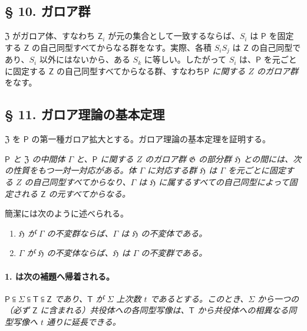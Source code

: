 \subsection*{§ 10. ガロア群}\label{die-galoissche-gruppe}

$\mathfrak Z$ がガロア体、すなわち $\mathsf{Z}_i$ が元の集合として一致するならば、$S_i$ は $\mathsf P$ を固定する $\mathsf{Z}$ の自己同型すべてからなる群をなす。実際、各積 $S_iS_j$ は $\mathsf{Z}$ の自己同型であり、$S_i$ 以外にはないから、ある $S_k$ に等しい。したがって $S_i$ は、$\mathsf P$ を元ごとに固定する $\mathsf{Z}$ の自己同型すべてからなる群、すなわち\emph{$\mathsf P$ に関する $Z$ のガロア群}をなす。

\subsection*{§ 11. ガロア理論の基本定理}\label{der-hauptsatz-der-galoisschen-theorie}

$\mathfrak Z$ を $\mathsf P$ の第一種ガロア拡大とする。ガロア理論の基本定理を証明する。

\emph{$\mathsf P$ と $\mathfrak Z$ の中間体 $\Gamma$ と、$\mathsf P$ に関する $Z$ のガロア群 $\mathfrak G$ の部分群 $\mathfrak H$ との間には、次の性質をもつ一対一対応がある。体 $\Gamma$ に対応する群 $\mathfrak H$ は $\Gamma$ を元ごとに固定する $Z$ の自己同型すべてからなり、$\Gamma$ は $\mathfrak H$ に属するすべての自己同型によって固定される $\mathsf{Z}$ の元すべてからなる。}

簡潔には次のように述べられる。

\begin{enumerate}
\item \emph{$\mathfrak H$ が $\Gamma$ の不変群ならば、$\Gamma$ は $\mathfrak H$ の不変体である。}
\item \emph{$\Gamma$ が $\mathfrak H$ の不変体ならば、$\mathfrak H$ は $\Gamma$ の不変群である。}
\end{enumerate}

\paragraph{1. は次の補題へ帰着される。}\label{laesst-sich-zurueckfuehren-auf-den-hilfssatz}

\emph{$\mathsf P \subseteqq \Sigma \subseteqq \mathsf T \subseteqq \mathsf Z$ であり、$\mathsf T$ が $\Sigma$ 上次数 $t$ であるとする。このとき、$\Sigma$ から一つの（必ず $\mathsf Z$ に含まれる）共役体への各同型写像は、$\mathsf T$ から共役体への相異なる同型写像へ $t$ 通りに延長できる。}

